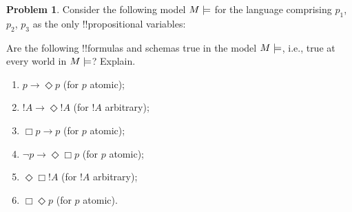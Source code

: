 \documentclass[10pt,a4paper]{article}
\theoremstyle{plain}
\theoremstyle{definition}
\newtheorem{prob}{Problem}[section]
\theoremstyle{remark}
\providecommand{\lif}{\mathbin{\rightarrow}}
\providecommand{\mModel}[2]{\ensuremath{#1 \models #2}}
\begin{document}
\begin{prob}
  Consider the following model $\mModel{M}$ for the language
  comprising $p_1$, $p_2$, $p_3$ as the only !!{propositional variable}s:
  \begin{center}
  \end{center}
  Are the following !!{formula}s and schemas true in the model $\mModel{M}$,
  i.e., true at every world in $\mModel{M}$? Explain.
  \begin{enumerate}
  \item $p\lif \Diamond p$ (for $p$ atomic);
  \item $!A\lif \Diamond !A$ (for $!A$ arbitrary);
  \item $\Box p \lif p$ (for $p$ atomic);
  \item $\lnot p \lif \Diamond \Box p$ (for $p$ atomic);
  \item $\Diamond \Box !A$ (for $!A$ arbitrary);
  \item $\Box \Diamond p$ (for $p$ atomic). 
  \end{enumerate}
\end{prob}
\end{document}
